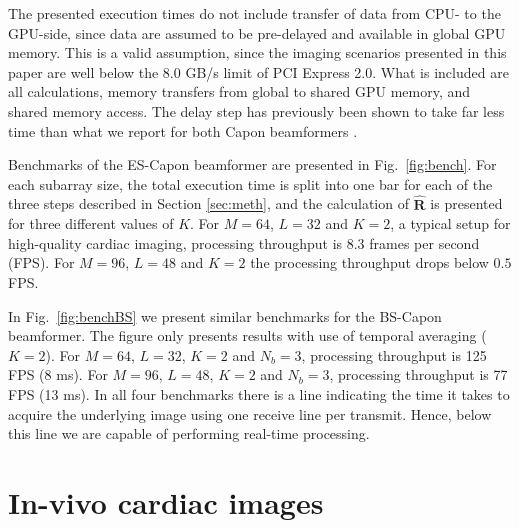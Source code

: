 \documentclass[journal]{IEEEtran}
\newcommand{\mat}[1]{\mathbf{#1}}
\newcommand\multimedia[1]{\textbf{{\color{red}#1}}}
\begin{document}
The presented execution times do not include transfer of data from CPU- to the GPU-side, since data are assumed to be pre-delayed and available in global GPU memory. This is a valid assumption, since the imaging scenarios presented in this paper are well below the 8.0 GB/s limit of PCI Express 2.0. What is included are all calculations, memory transfers from global to shared GPU memory, and shared memory access. The delay step has previously been shown to take far less time than what we report for both Capon beamformers \cite{Song2012, Chen2011}.

Benchmarks of the ES-Capon beamformer are presented in Fig.\ \ref{fig:bench}. For each subarray size, the total execution time is split into one bar for each of the three steps described in Section \ref{sec:meth}, and the calculation of $\mat{\hat{R}}$ is presented for three different values of $K$. For $M=64$, $L=32$ and $K=2$, a typical setup for high-quality cardiac imaging, processing throughput is 8.3 frames per second (FPS). For $M=96$, $L=48$ and $K=2$ the processing throughput drops below $0.5$ FPS.

In Fig.\ \ref{fig:benchBS} we present similar benchmarks for the BS-Capon beamformer. The figure only presents results with use of temporal averaging ($K=2$). For $M=64$, $L=32$, $K=2$ and $N_b=3$, processing throughput is 125 FPS (8 ms). For $M=96$, $L=48$, $K=2$ and $N_b=3$, processing throughput is 77 FPS (13 ms). In all four benchmarks there is a line indicating the time it takes to acquire the underlying image using one receive line per transmit. Hence, below this line we are capable of performing real-time processing.

\section{In-vivo cardiac images}\label{sec:images}

\end{document}
